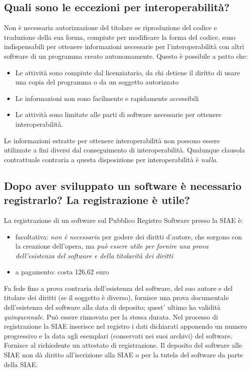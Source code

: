 \subsection{Quali sono le eccezioni per interoperabilità?}
Non è necessaria autorizzazione del titolare se riproduzione del codice e traduzione della sua forma, compiute per modificare la forma del codice, 
sono indispensabili per ottenere informazioni necessarie per l'interoperabilità con altri software di un programma creato
autonomamente. Questo è possibile a patto che:
\begin{itemize}
    \item Le attività sono compiute dal licenziatario, da chi detiene il diritto di usare una copia del programma o da un soggetto autorizzato
    \item Le informazioni non sono facilmente e rapidamente accessibili
    \item Le attività sono limitate alle parti di software necessarie per ottenere interoperabilità.
\end{itemize}
Le informazioni estratte per ottenere interoperabilità non possono essere utilizzate a fini diversi dal conseguimento di interoperabilità. Qualunque clausola contrattuale
contraria a questa disposizione per interoperabilità è \emph{nulla}.

\subsection{Dopo aver sviluppato un software è necessario registrarlo? La registrazione è utile?}
La registrazione di un software sul Pubblico Registro Software presso la SIAE è:
\begin{itemize}
    \item facoltativa: \emph{non è necessaria} per godere dei diritti d'autore, che sorgono con la creazione dell'opera,
    ma \emph{può essere utile per fornire una prova dell'esistenza del software e della titolarità dei diritti}
    \item a pagamento: costa 126,62 euro
\end{itemize}
Fa fede fino a prova contraria dell'esistenza del software, del suo autore e del titolare dei diritti (se il soggetto è diverso),
fornisce una prova documentale dell'esistenza del software alla data di deposito; quest' ultimo ha validità \emph{quinquennale}. Può
essere rinnovato per la stessa durata.\newline
Nel processo di registrazione la SIAE inserisce nel registro i dati dichiarati apponendo un numero progressivo e la data agli esemplari (conservati nei suoi archivi)
del software. Fornisce al richiedente un attestato di registrazione.\newline
Il deposito del software alle SIAE non dà diritto all'iscrizione alla SIAE o per la tutela del software
da parte della SIAE.

